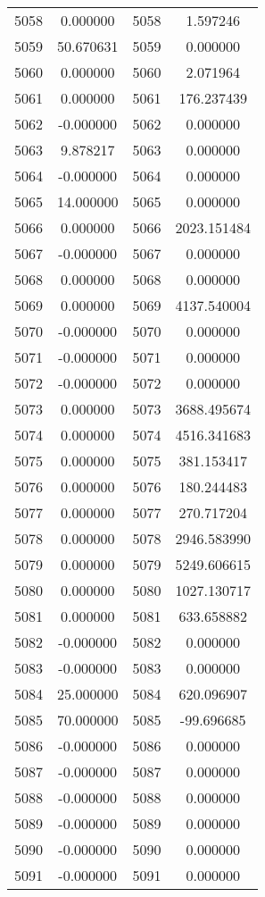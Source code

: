 \documentclass[12pt]{article}
\begin{document}
\begin{longtable}{@{}cccc@{}}
5058 & 0.000000 & 5058 & 1.597246 \\
5059 & 50.670631 & 5059 & 0.000000 \\
5060 & 0.000000 & 5060 & 2.071964 \\
5061 & 0.000000 & 5061 & 176.237439 \\
5062 & -0.000000 & 5062 & 0.000000 \\
5063 & 9.878217 & 5063 & 0.000000 \\
5064 & -0.000000 & 5064 & 0.000000 \\
5065 & 14.000000 & 5065 & 0.000000 \\
5066 & 0.000000 & 5066 & 2023.151484 \\
5067 & -0.000000 & 5067 & 0.000000 \\
5068 & 0.000000 & 5068 & 0.000000 \\
5069 & 0.000000 & 5069 & 4137.540004 \\
5070 & -0.000000 & 5070 & 0.000000 \\
5071 & -0.000000 & 5071 & 0.000000 \\
5072 & -0.000000 & 5072 & 0.000000 \\
5073 & 0.000000 & 5073 & 3688.495674 \\
5074 & 0.000000 & 5074 & 4516.341683 \\
5075 & 0.000000 & 5075 & 381.153417 \\
5076 & 0.000000 & 5076 & 180.244483 \\
5077 & 0.000000 & 5077 & 270.717204 \\
5078 & 0.000000 & 5078 & 2946.583990 \\
5079 & 0.000000 & 5079 & 5249.606615 \\
5080 & 0.000000 & 5080 & 1027.130717 \\
5081 & 0.000000 & 5081 & 633.658882 \\
5082 & -0.000000 & 5082 & 0.000000 \\
5083 & -0.000000 & 5083 & 0.000000 \\
5084 & 25.000000 & 5084 & 620.096907 \\
5085 & 70.000000 & 5085 & -99.696685 \\
5086 & -0.000000 & 5086 & 0.000000 \\
5087 & -0.000000 & 5087 & 0.000000 \\
5088 & -0.000000 & 5088 & 0.000000 \\
5089 & -0.000000 & 5089 & 0.000000 \\
5090 & -0.000000 & 5090 & 0.000000 \\
5091 & -0.000000 & 5091 & 0.000000 \\

\end{longtable}
\end{document}
